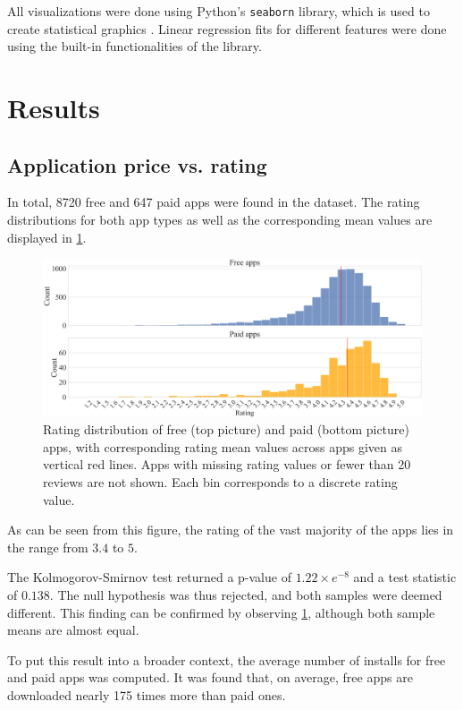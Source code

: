 \documentclass{article}
\begin{document}
All visualizations were done using Python's \verb+seaborn+ library, which is used to create statistical graphics \cite{seaborn}. Linear regression fits for different features were done using the built-in functionalities of the library.

\section{Results}

\subsection{Application price vs. rating}
\label{pricerating}

In total, 8720 free and 647 paid apps were found in the dataset.
The rating distributions for both app types as well as the corresponding mean values are displayed in \cref{fig1}.

\begin{figure}[h]
    \centering
    \includegraphics[scale=0.23]{figures/rating_distr.png}
    \caption{Rating distribution of free (top picture) and paid (bottom picture) apps, with corresponding rating mean values across apps given as vertical red lines. Apps with missing rating values or fewer than 20 reviews are not shown. Each bin corresponds to a discrete rating value.}
    \label{fig1}
\end{figure}

As can be seen from this figure, the rating of the vast majority of the apps lies in the range from $3.4$ to $5$.

The Kolmogorov-Smirnov test returned a p-value of $1.22\times e^{-8}$ and a test statistic of $0.138$. The null hypothesis was thus rejected, and both samples were deemed different. This finding can be confirmed by observing \cref{fig1}, although both sample means are almost equal.

To put this result into a broader context, the average number of installs for free and paid apps was computed. It was found that, on average, free apps are downloaded nearly 175 times more than paid ones. 
\end{document}
